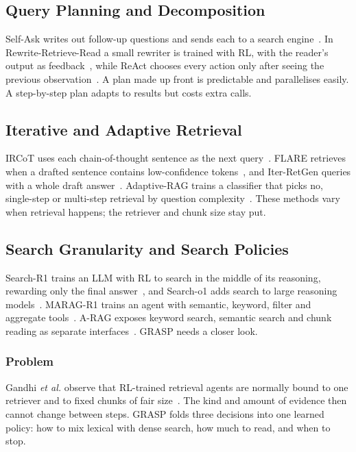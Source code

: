 \documentclass[conference]{IEEEtran}
\begin{document}
\subsection{Query Planning and Decomposition}
Self-Ask writes out follow-up questions and sends each to a search engine~\cite{press2023selfask}. In Rewrite-Retrieve-Read a small rewriter is trained with RL, with the reader's output as feedback~\cite{ma2023rewrite}, while ReAct chooses every action only after seeing the previous observation~\cite{yao2023react}. A plan made up front is predictable and parallelises easily. A step-by-step plan adapts to results but costs extra calls.

\subsection{Iterative and Adaptive Retrieval}
IRCoT uses each chain-of-thought sentence as the next query~\cite{trivedi2023ircot}. FLARE retrieves when a drafted sentence contains low-confidence tokens~\cite{jiang2023flare}, and Iter-RetGen queries with a whole draft answer~\cite{shao2023iterretgen}. Adaptive-RAG trains a classifier that picks no, single-step or multi-step retrieval by question complexity~\cite{jeong2024adaptiverag}. These methods vary when retrieval happens; the retriever and chunk size stay put.

\subsection{Search Granularity and Search Policies}
\label{sec:grasp}
Search-R1 trains an LLM with RL to search in the middle of its reasoning, rewarding only the final answer~\cite{jin2025searchr1}, and Search-o1 adds search to large reasoning models~\cite{li2025searcho1}. MARAG-R1 trains an agent with semantic, keyword, filter and aggregate tools~\cite{luo2025maragr1}. A-RAG exposes keyword search, semantic search and chunk reading as separate interfaces~\cite{du2026arag}. GRASP needs a closer look.

\subsubsection{Problem}
Gandhi \textit{et al.} observe that RL-trained retrieval agents are normally bound to one retriever and to fixed chunks of fair size~\cite{gandhi2026grasp}. The kind and amount of evidence then cannot change between steps. GRASP folds three decisions into one learned policy: how to mix lexical with dense search, how much to read, and when to stop.
\end{document}
